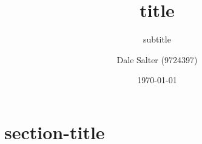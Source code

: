 \documentclass[12pt, numbers=endperiod]{scrartcl}
\title{title}
\subtitle{subtitle}
\author{Dale Salter (9724397)}
\date{\today}
\begin{document}
\maketitle

\section{section-title}
\end{document}
